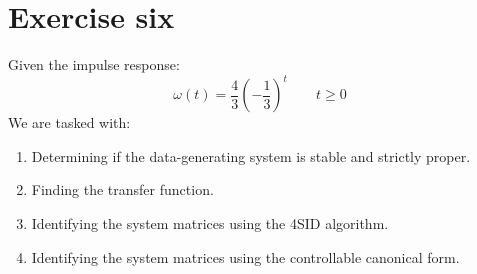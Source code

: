 \section{Exercise six}

Given the impulse response:
\[\omega(t)=\dfrac{4}{3}\left(-\dfrac{1}{3}\right)^t \qquad t\geq 0\]
We are tasked with:
\begin{enumerate}
    \item Determining if the data-generating system is stable and strictly proper.
    \item Finding the transfer function.
    \item Identifying the system matrices using the 4SID algorithm.
    \item Identifying the system matrices using the controllable canonical form.
\end{enumerate}

